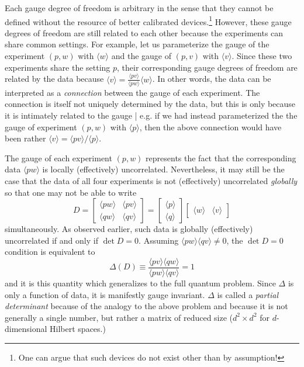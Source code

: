 \documentclass[pra, 10pt, notitlepage, twocolumn]{revtex4-1}
\begin{document}
Each gauge degree of freedom is arbitrary in the sense that they cannot be defined without the resource of better calibrated devices.\footnote{
One can argue that such devices do not exist other than by assumption!}
However, these gauge degrees of freedom are still related to each other because the experiments can share common settings.
For example, let us parameterize the gauge of the experiment $(p,w)$ with ${\langle w \rangle}$ and the gauge of $(p,v)$ with ${\langle v \rangle}$.
Since these two experiments share the setting $p$, their corresponding gauge degrees of freedom are related by the data
because ${\langle v \rangle} = \frac{\langle pv \rangle}{\langle pw \rangle} {\langle w \rangle}$.
In other words, the data can be interpreted as a \emph{connection} between the gauge of each experiment.
The connection is itself not uniquely determined by the data, but this is only because it is intimately related to the gauge
| e.g. if we had instead parameterized the the gauge of experiment $(p,w)$ with ${\langle p \rangle}$,
then the above connection would have been rather ${\langle v \rangle} = {\langle pv \rangle}/{\langle p \rangle}$.

The gauge of each experiment $(p,w)$ represents the fact that the corresponding data $\langle pw \rangle$ is locally (effectively) uncorrelated.
Nevertheless, it may still be the case that the data of all four experiments is not (effectively) uncorrelated \emph{globally} so that one may not be able to write
\begin{equation}\label{global}
D = 
\left[
\begin{array}{cc}
	\langle pw \rangle & \langle pv \rangle	\\
	\langle qw \rangle & \langle qv \rangle
\end{array}
\right]
=
\left[
\begin{array}{c}
	\langle p \rangle	\\
	\langle q \rangle
\end{array}
\right]
\left[
\begin{array}{cc}
	\langle w \rangle & \langle v \rangle
\end{array}
\right]
\end{equation}
simultaneously.
As observed earlier, such data is globally (effectively) uncorrelated if and only if $\det D = 0$.
Assuming $\langle pw \rangle\langle qv \rangle\neq0$, the $\det D = 0$ condition is equivalent to
\begin{equation}
	\Delta(D) \equiv \frac{\langle pv \rangle\langle qw \rangle}{\langle pw \rangle \langle qv \rangle}=1
\end{equation}
and it is this quantity which generalizes to the full quantum problem.\cite{jackson2015detecting}
Since $\Delta$ is only a function of data, it is manifestly gauge invariant.
$\Delta$ is called a \emph{partial determinant} because of the analogy to the above problem and because it is not generally a single number, but rather a matrix of reduced size ($d^2 \times d^2$ for $d$-dimensional Hilbert spaces.)
\end{document}
